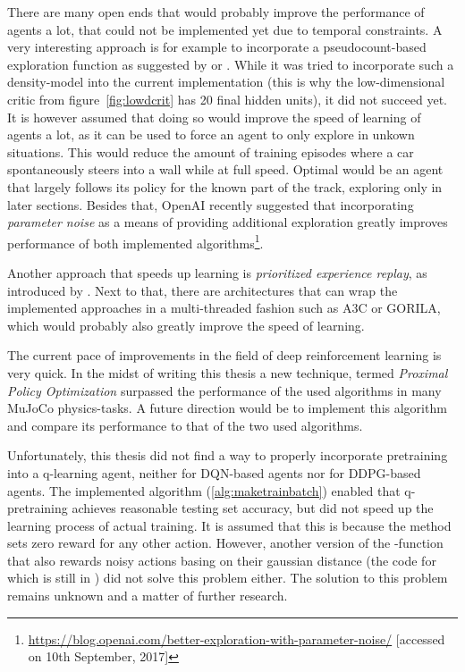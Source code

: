There are many open ends that would probably improve the performance of agents a lot, that could not be implemented yet due to temporal constraints. A very interesting approach is for example to incorporate a pseudocount-based exploration function as suggested by \cite{ostrovski_count-based_2017} or \cite{martin_count-based_2017}. While it was tried to incorporate such a density-model into the current implementation (this is why the low-dimensional critic from figure~\ref{fig:lowdcrit} has 20 final hidden units), it did not succeed yet. It is however assumed that doing so would improve the speed of learning of agents a lot, as it can be used to force an agent to only explore in unkown situations. This would reduce the amount of training episodes where a car spontaneously steers into a wall while at full speed. Optimal would be an agent that largely follows its policy for the known part of the track, exploring only in later sections. Besides that, OpenAI recently suggested that incorporating \textit{parameter noise} as a means of providing additional exploration greatly improves performance of both implemented algorithms\footnote{\url{https://blog.openai.com/better-exploration-with-parameter-noise/} [accessed on 10th September, 2017]}.

Another approach that speeds up learning is \textit{prioritized experience replay}, as introduced by \cite{schaul_prioritized_2015}. Next to that, there are architectures that can wrap the implemented approaches in a multi-threaded fashion such as  A3C\cite{mnih_asynchronous_2016} or GORILA\cite{nair_massively_2015}, which would probably also greatly improve the speed of learning.

The current pace of improvements in the field of deep reinforcement learning is very quick. In the midst of writing this thesis a new technique, termed \textit{Proximal Policy Optimization} \cite{schulman_proximal_2017} surpassed the performance of the used algorithms in many MuJoCo physics-tasks. A future direction would be to implement this algorithm and compare its performance to that of the two used algorithms.

Unfortunately, this thesis did not find a way to properly incorporate pretraining into a q-learning agent, neither for DQN-based agents nor for DDPG-based agents. The implemented algorithm (\ref{alg:maketrainbatch}) enabled that q-pretraining achieves reasonable testing set accuracy, but did not speed up the learning process of actual training. It is assumed that this is because the method sets zero reward for any other action. However, another version of the -function that also rewards noisy actions basing on their gaussian distance (the code for which is still in ) did not solve this problem either. The solution to this problem remains unknown and a matter of further research.

